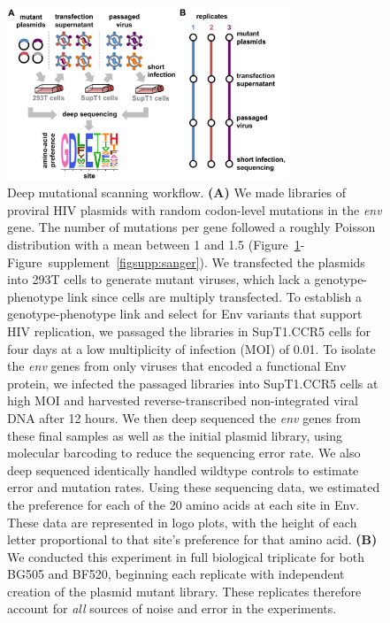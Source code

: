 \documentclass[9pt]{elife}
\begin{document}
\begin{figure}
\centerline{\includegraphics[width=0.75\textwidth]{figures/dms_schematic/dms_schematic.pdf}}
\caption{\label{fig:dms_schematic}
Deep mutational scanning workflow.
{\bf (A)} We made libraries of proviral HIV plasmids with random codon-level mutations in the \textit{env} gene.
The number of mutations per gene followed a roughly Poisson distribution with a mean between 1 and 1.5 (Figure~\ref{fig:dms_schematic}-Figure~supplement~\ref{figsupp:sanger}).
We transfected the plasmids into 293T cells to generate mutant viruses, which lack a genotype-phenotype link since cells are multiply transfected.
To establish a genotype-phenotype link and select for Env variants that support HIV replication, we passaged the libraries in SupT1.CCR5 cells for four days at a low multiplicity of infection (MOI) of 0.01.
To isolate the \textit{env} genes from only viruses that encoded a functional Env protein, we infected the passaged libraries into SupT1.CCR5 cells at high MOI and harvested reverse-transcribed non-integrated viral DNA after 12 hours.
We then deep sequenced the \textit{env} genes from these final samples as well as the initial plasmid library, using molecular barcoding to reduce the sequencing error rate.
We also deep sequenced identically handled wildtype controls to estimate error and mutation rates.
Using these sequencing data, we estimated the preference for each of the 20 amino acids at each site in Env.
These data are represented in logo plots, with the height of each letter proportional to that site's preference for that amino acid.
{\bf (B)} We conducted this experiment in full biological triplicate for both BG505 and BF520, beginning each replicate with independent creation of the plasmid mutant library.
These replicates therefore account for \emph{all} sources of noise and error in the experiments.
}
\end{figure}
\end{document}
